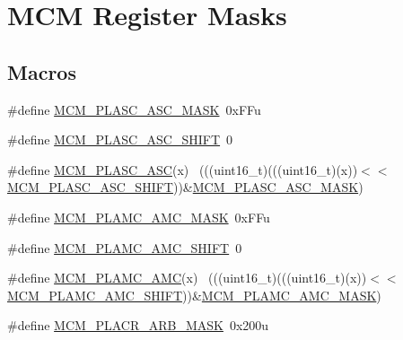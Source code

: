 \hypertarget{group___m_c_m___register___masks}{}\section{M\+CM Register Masks}
\label{group___m_c_m___register___masks}
\subsection*{Macros}
\begin{DoxyCompactItemize}
\item 
\#define \hyperlink{group___m_c_m___register___masks_ga215cf860c41174735020a34e7ccf9590}{M\+C\+M\+\_\+\+P\+L\+A\+S\+C\+\_\+\+A\+S\+C\+\_\+\+M\+A\+SK}~0x\+F\+Fu
\item 
\#define \hyperlink{group___m_c_m___register___masks_ga88f833168fd51e1b3c950e21b00bbfc3}{M\+C\+M\+\_\+\+P\+L\+A\+S\+C\+\_\+\+A\+S\+C\+\_\+\+S\+H\+I\+FT}~0
\item 
\#define \hyperlink{group___m_c_m___register___masks_gadbabfd7e827544257764056bbc98fd34}{M\+C\+M\+\_\+\+P\+L\+A\+S\+C\+\_\+\+A\+SC}(x)                                              ~(((uint16\+\_\+t)(((uint16\+\_\+t)(x))$<$$<$\hyperlink{group___m_c_m___register___masks_ga88f833168fd51e1b3c950e21b00bbfc3}{M\+C\+M\+\_\+\+P\+L\+A\+S\+C\+\_\+\+A\+S\+C\+\_\+\+S\+H\+I\+FT}))\&\hyperlink{group___m_c_m___register___masks_ga215cf860c41174735020a34e7ccf9590}{M\+C\+M\+\_\+\+P\+L\+A\+S\+C\+\_\+\+A\+S\+C\+\_\+\+M\+A\+SK})
\item 
\#define \hyperlink{group___m_c_m___register___masks_ga7988227df54012705c7f522f348214ee}{M\+C\+M\+\_\+\+P\+L\+A\+M\+C\+\_\+\+A\+M\+C\+\_\+\+M\+A\+SK}~0x\+F\+Fu
\item 
\#define \hyperlink{group___m_c_m___register___masks_gaa1b3153d0bf749f80fffacd948dd4bd4}{M\+C\+M\+\_\+\+P\+L\+A\+M\+C\+\_\+\+A\+M\+C\+\_\+\+S\+H\+I\+FT}~0
\item 
\#define \hyperlink{group___m_c_m___register___masks_ga62d94ee71c272adf6c5a19fad692672c}{M\+C\+M\+\_\+\+P\+L\+A\+M\+C\+\_\+\+A\+MC}(x)                                              ~(((uint16\+\_\+t)(((uint16\+\_\+t)(x))$<$$<$\hyperlink{group___m_c_m___register___masks_gaa1b3153d0bf749f80fffacd948dd4bd4}{M\+C\+M\+\_\+\+P\+L\+A\+M\+C\+\_\+\+A\+M\+C\+\_\+\+S\+H\+I\+FT}))\&\hyperlink{group___m_c_m___register___masks_ga7988227df54012705c7f522f348214ee}{M\+C\+M\+\_\+\+P\+L\+A\+M\+C\+\_\+\+A\+M\+C\+\_\+\+M\+A\+SK})
\item 
\#define \hyperlink{group___m_c_m___register___masks_gaeea6e96c143304d5bb05ea7fc403efc3}{M\+C\+M\+\_\+\+P\+L\+A\+C\+R\+\_\+\+A\+R\+B\+\_\+\+M\+A\+SK}~0x200u

\end{DoxyCompactItemize}
